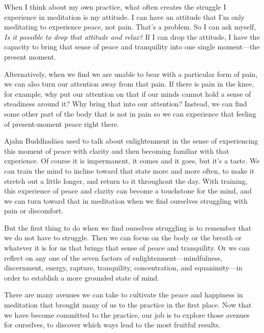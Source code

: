 When I think about my own practice, what often creates the struggle I 
experience in meditation is my attitude. I can have an attitude that 
I'm only meditating to experience peace, not pain. That's a problem. So 
I can ask myself, \emph{Is it possible to drop that attitude and 
relax?} If I can drop the attitude, I have the capacity to bring that 
sense of peace and tranquility into one single moment---the present 
moment.

Alternatively, when we find we are unable to bear with a particular 
form of pain, we can also turn our attention away from that pain. If 
there is pain in the knee, for example, why put our attention on that 
if our minds cannot hold a sense of steadiness around it? Why bring 
that into our attention? Instead, we can find some other part of the 
body that is not in pain so we can experience that feeling of 
present-moment peace right there.

Ajahn Buddhadāsa used to talk about enlightenment in the sense of 
experiencing this moment of peace with clarity and then becoming 
familiar with that experience. Of course it is impermanent, it comes 
and it goes, but it's a taste. We can train the mind to incline toward 
that state more and more often, to make it stretch out a little longer, 
and return to it throughout the day. With training, this experience of 
peace and clarity can become a touchstone for the mind, and we can turn 
toward that in meditation when we find ourselves struggling with pain 
or discomfort.

But the first thing to do when we find ourselves struggling is to 
remember that we do not have to struggle. Then we can focus on the body 
or the breath or whatever it is for us that brings that sense of peace 
and tranquility. Or we can reflect on any one of the seven factors of 
enlightenment---mindfulness, discernment, energy, rapture, tranquility, 
concentration, and equanimity---in order to establish a more grounded 
state of mind.

There are many avenues we can take to cultivate the peace and happiness 
in meditation that brought many of us to the practice in the first 
place. Now that we have become committed to the practice, our job is to 
explore those avenues for ourselves, to discover which ways lead to the 
most fruitful results.


